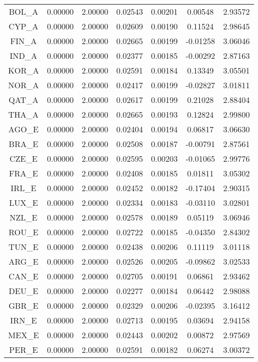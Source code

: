 \begin{longtable}{c c c c c c c}
BOL_A & 0.00000 & 2.00000 & 0.02543 & 0.00201 & 0.00548 & 2.93572 \\
CYP_A & 0.00000 & 2.00000 & 0.02609 & 0.00190 & 0.11524 & 2.98645 \\
FIN_A & 0.00000 & 2.00000 & 0.02665 & 0.00199 & -0.01258 & 3.06046 \\
IND_A & 0.00000 & 2.00000 & 0.02377 & 0.00185 & -0.00292 & 2.87163 \\
KOR_A & 0.00000 & 2.00000 & 0.02591 & 0.00184 & 0.13349 & 3.05501 \\
NOR_A & 0.00000 & 2.00000 & 0.02417 & 0.00199 & -0.02827 & 3.01811 \\
QAT_A & 0.00000 & 2.00000 & 0.02617 & 0.00199 & 0.21028 & 2.88404 \\
THA_A & 0.00000 & 2.00000 & 0.02665 & 0.00193 & 0.12824 & 2.99800 \\
AGO_E & 0.00000 & 2.00000 & 0.02404 & 0.00194 & 0.06817 & 3.06630 \\
BRA_E & 0.00000 & 2.00000 & 0.02508 & 0.00187 & -0.00791 & 2.87561 \\
CZE_E & 0.00000 & 2.00000 & 0.02595 & 0.00203 & -0.01065 & 2.99776 \\
FRA_E & 0.00000 & 2.00000 & 0.02408 & 0.00185 & 0.01811 & 3.05302 \\
IRL_E & 0.00000 & 2.00000 & 0.02452 & 0.00182 & -0.17404 & 2.90315 \\
LUX_E & 0.00000 & 2.00000 & 0.02334 & 0.00183 & -0.03110 & 3.02801 \\
NZL_E & 0.00000 & 2.00000 & 0.02578 & 0.00189 & 0.05119 & 3.06946 \\
ROU_E & 0.00000 & 2.00000 & 0.02722 & 0.00185 & -0.04350 & 2.84302 \\
TUN_E & 0.00000 & 2.00000 & 0.02438 & 0.00206 & 0.11119 & 3.01118 \\
ARG_E & 0.00000 & 2.00000 & 0.02526 & 0.00205 & -0.09862 & 3.02533 \\
CAN_E & 0.00000 & 2.00000 & 0.02705 & 0.00191 & 0.06861 & 2.93462 \\
DEU_E & 0.00000 & 2.00000 & 0.02277 & 0.00184 & 0.06442 & 2.98088 \\
GBR_E & 0.00000 & 2.00000 & 0.02329 & 0.00206 & -0.02395 & 3.16412 \\
IRN_E & 0.00000 & 2.00000 & 0.02713 & 0.00195 & 0.03694 & 2.94158 \\
MEX_E & 0.00000 & 2.00000 & 0.02443 & 0.00202 & 0.00872 & 2.97569 \\
PER_E & 0.00000 & 2.00000 & 0.02591 & 0.00182 & 0.06274 & 3.00372 \\

\end{longtable}

